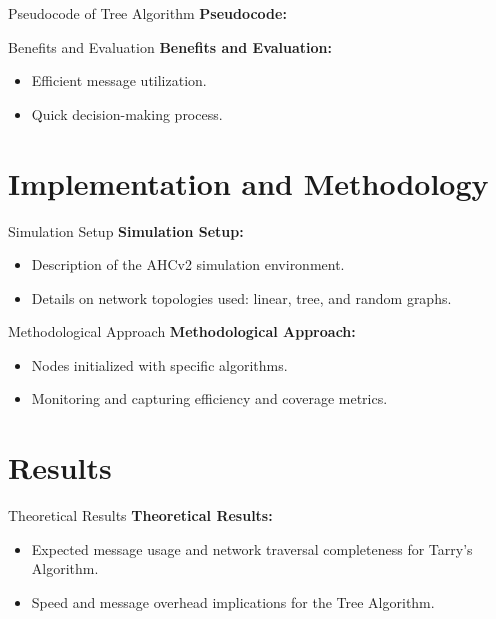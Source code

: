 \documentclass[11pt]{beamer}
\begin{document}
\begin{frame}{Pseudocode of Tree Algorithm}
    \textbf{Pseudocode:}
    \begin{algorithm}[H]
    \SetAlgoLined
    \caption{Tree Algorithm}
    \end{algorithm}
\end{frame}

\begin{frame}{Benefits and Evaluation}
    \textbf{Benefits and Evaluation:}
    \begin{itemize}
        \item Efficient message utilization.
        \item Quick decision-making process.
    \end{itemize}
\end{frame}

\section{Implementation and Methodology}
\begin{frame}{Simulation Setup}
    \textbf{Simulation Setup:}
    \begin{itemize}
        \item Description of the AHCv2 simulation environment.
        \item Details on network topologies used: linear, tree, and random graphs.
    \end{itemize}
\end{frame}

\begin{frame}{Methodological Approach}
    \textbf{Methodological Approach:}
    \begin{itemize}
        \item Nodes initialized with specific algorithms.
        \item Monitoring and capturing efficiency and coverage metrics.
    \end{itemize}
\end{frame}

\section{Results}
\begin{frame}{Theoretical Results}
    \textbf{Theoretical Results:}
    \begin{itemize}
        \item Expected message usage and network traversal completeness for Tarry's Algorithm.
        \item Speed and message overhead implications for the Tree Algorithm.
    \end{itemize}
\end{frame}
\end{document}
